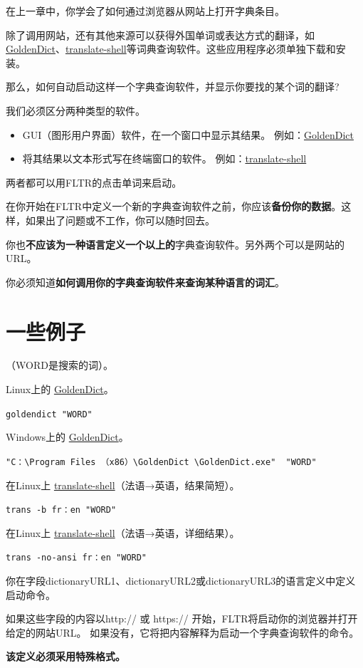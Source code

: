 \documentclass[cn,10pt,math=newtx,citestyle=gb7714-2015,bibstyle=gb7714-2015]{elegantbook}
\newcommand{\goldendict}{\href{http://goldendict.org/}{GoldenDict}}
\newcommand{\translateshell}{\href{https://github.com/soimort/translate-shell}{translate-shell}}
\begin{document}
在上一章中，你学会了如何通过浏览器从网站上打开字典条目。

除了调用网站，还有其他来源可以获得外国单词或表达方式的翻译，如 \goldendict、\translateshell 等词典查询软件。这些应用程序必须单独下载和安装。

那么，如何自动启动这样一个字典查询软件，并显示你要找的某个词的翻译?

我们必须区分两种类型的软件。

\begin{itemize}
    \item  GUI（图形用户界面）软件，在一个窗口中显示其结果。
例如：\goldendict
    \item 将其结果以文本形式写在终端窗口的软件。
例如：\href{https://github.com/soimort/translate-shell}{translate-shell}
\end{itemize}
 
两者都可以用FLTR的点击单词来启动。

在你开始在FLTR中定义一个新的字典查询软件之前，你应该\textbf{备份你的数据}。这样，如果出了问题或不工作，你可以随时回去。

你也\textbf{不应该为一种语言定义一个以上的}字典查询软件。另外两个可以是网站的URL。

你必须知道\textbf{如何调用你的字典查询软件来查询某种语言的词汇}。


\section*{一些例子}（WORD是搜索的词）。

Linux上的 \goldendict。

\lstinline{goldendict "WORD"}

Windows上的 \goldendict。

\lstinline{"C：\Program Files （x86）\GoldenDict \GoldenDict.exe"  "WORD"}

在Linux上 \translateshell （法语→英语，结果简短）。


\lstinline{trans -b fr：en "WORD"}


在Linux上 \translateshell （法语→英语，详细结果）。


\lstinline{trans -no-ansi fr：en "WORD"}


你在字段dictionaryURL1、dictionaryURL2或dictionaryURL3的语言定义中定义启动命令。

如果这些字段的内容以http:// 或 https:// 开始，FLTR将启动你的浏览器并打开给定的网站URL。
如果没有，它将把内容解释为启动一个字典查询软件的命令。

\textbf{该定义必须采用特殊格式。}
\end{document}
